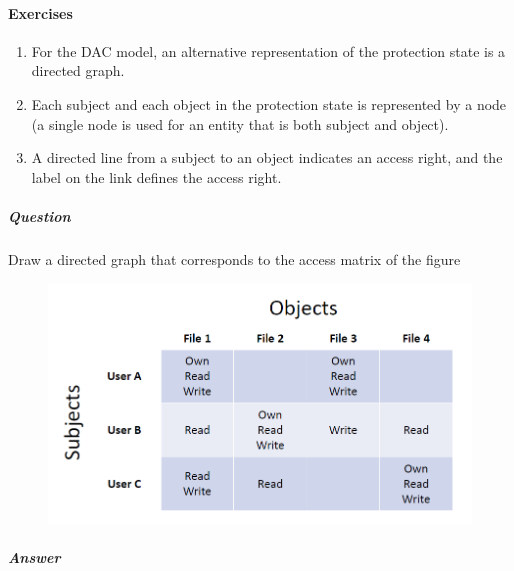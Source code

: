 \documentclass{article}
\begin{document}
                        \paragraph{Exercises}
                                \begin{enumerate}
                                    \item For the DAC model, an alternative representation of the protection state is a directed graph.
                                    \item Each subject and each object in the protection state is represented by a node (a single node is used for an entity that is both subject and object).
                                    \item A directed line from a subject to an object indicates an access right, and the label on the link defines the access right.
                                \end{enumerate}
                                \subparagraph{Question}
                                Draw a directed graph that corresponds to
                                the access matrix of the figure

                                \begin{figure}[h]
                                    \begin{center}
                                        \includegraphics[scale=0.6]{../immagini/exacla.png}
                                    \end{center}
                                    
                                \end{figure}

                                \subparagraph{Answer}
                                    
\end{document}
